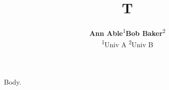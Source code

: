 \documentclass{article}
\title{T}
\author{\textbf{Ann Able}\textsuperscript{1}\;\;\textbf{Bob Baker}\textsuperscript{2}\\
\textsuperscript{1}Univ A\; \textsuperscript{2}Univ B}
\begin{document}
\maketitle
Body.
\end{document}
